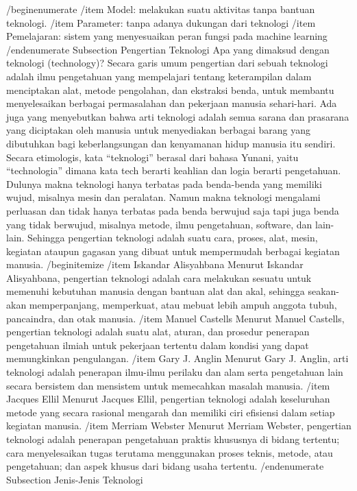 /begin{enumerate}
/item Model: melakukan suatu aktivitas tanpa bantuan teknologi.
/item Parameter: tanpa adanya dukungan dari teknologi
/item Pemelajaran: sistem yang menyesuaikan peran fungsi pada machine learning
/end{enumerate}
Subsection{ Pengertian Teknologi}
Apa yang dimaksud dengan teknologi (technology)? Secara garis umum pengertian dari sebuah  teknologi adalah ilmu pengetahuan yang mempelajari tentang keterampilan dalam menciptakan alat, metode pengolahan, dan ekstraksi benda, untuk membantu menyelesaikan berbagai permasalahan dan pekerjaan manusia sehari-hari.
Ada juga yang menyebutkan bahwa arti teknologi adalah semua sarana dan prasarana yang diciptakan oleh manusia untuk menyediakan berbagai barang yang dibutuhkan bagi keberlangsungan dan kenyamanan hidup manusia itu sendiri. Secara etimologis, kata “teknologi” berasal dari bahasa Yunani, yaitu “technologia” dimana kata tech berarti keahlian dan logia berarti pengetahuan.
Dulunya makna teknologi hanya terbatas pada benda-benda yang memiliki wujud, misalnya mesin dan peralatan. Namun makna teknologi mengalami perluasan dan tidak hanya terbatas pada benda berwujud saja tapi juga benda yang tidak berwujud, misalnya metode, ilmu pengetahuan, software, dan lain-lain. Sehingga pengertian teknologi adalah suatu cara, proses, alat, mesin, kegiatan ataupun gagasan yang dibuat untuk mempermudah berbagai kegiatan manusia.
/begin{itemize}
/item Iskandar Alisyahbana
Menurut Iskandar Alisyahbana, pengertian teknologi adalah cara melakukan sesuatu untuk memenuhi kebutuhan manusia dengan bantuan alat dan akal, sehingga seakan-akan memperpanjang, memperkuat, atau mebuat lebih ampuh anggota tubuh, pancaindra, dan otak manusia.
/item Manuel Castells
Menurut Manuel Castells, pengertian teknologi adalah suatu alat, aturan, dan prosedur penerapan pengetahuan ilmiah untuk pekerjaan tertentu dalam kondisi yang dapat memungkinkan pengulangan.
/item Gary J. Anglin
Menurut Gary J. Anglin, arti teknologi adalah penerapan ilmu-ilmu perilaku dan alam serta pengetahuan lain secara bersistem dan mensistem untuk memecahkan masalah manusia.
/item Jacques Ellil
Menurut Jacques Ellil, pengertian teknologi adalah keseluruhan metode yang secara rasional mengarah dan memiliki ciri efisiensi dalam setiap kegiatan manusia.
/item Merriam Webster
Menurut Merriam Webster, pengertian teknologi adalah penerapan pengetahuan praktis khususnya di bidang tertentu; cara menyelesaikan tugas terutama menggunakan proses teknis, metode, atau pengetahuan; dan aspek khusus dari bidang usaha tertentu.
/end{enumerate}
Subsection {Jenis-Jenis Teknologi}

